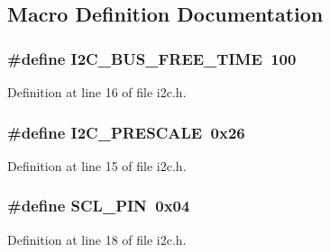 \subsection{Macro Definition Documentation}
\subsubsection[{\texorpdfstring{I2\+C\+\_\+\+B\+U\+S\+\_\+\+F\+R\+E\+E\+\_\+\+T\+I\+ME}{I2C_BUS_FREE_TIME}}]{\setlength{\rightskip}{0pt plus 5cm}\#define I2\+C\+\_\+\+B\+U\+S\+\_\+\+F\+R\+E\+E\+\_\+\+T\+I\+ME~100}\hypertarget{group___i2_c_gad5f4d29f56fdf15e6d198a3383dfcc0f}{}\label{group___i2_c_gad5f4d29f56fdf15e6d198a3383dfcc0f}


Definition at line 16 of file i2c.\+h.

\subsubsection[{\texorpdfstring{I2\+C\+\_\+\+P\+R\+E\+S\+C\+A\+LE}{I2C_PRESCALE}}]{\setlength{\rightskip}{0pt plus 5cm}\#define I2\+C\+\_\+\+P\+R\+E\+S\+C\+A\+LE~0x26}\hypertarget{group___i2_c_gafb9001a03955fc02cf3bbf44bcd8d975}{}\label{group___i2_c_gafb9001a03955fc02cf3bbf44bcd8d975}


Definition at line 15 of file i2c.\+h.

\subsubsection[{\texorpdfstring{S\+C\+L\+\_\+\+P\+IN}{SCL_PIN}}]{\setlength{\rightskip}{0pt plus 5cm}\#define S\+C\+L\+\_\+\+P\+IN~0x04}\hypertarget{group___i2_c_ga06c967e78bcedcee909a70764f879433}{}\label{group___i2_c_ga06c967e78bcedcee909a70764f879433}


Definition at line 18 of file i2c.\+h.

